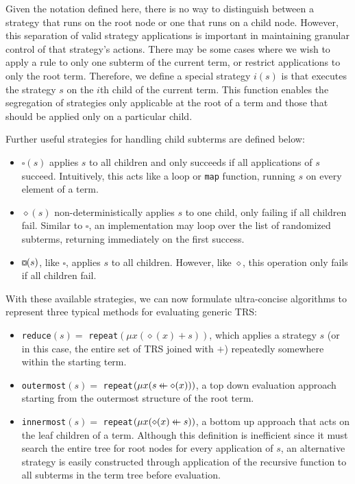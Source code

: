 \documentclass{article}
\makeatletter
\newcommand{\superimpose}[2]{{%
  \ooalign{%
    \hfil$\m@th#1\@firstoftwo#2$\hfil\cr
    \hfil$\m@th#1\@secondoftwo#2$\hfil\cr
  }%
}}
\newcommand{\leftplus}{\mathbin{\mathpalette\superimpose{{\leftarrow}{+}}}}
\newcommand{\disquare}{\mathbin{\text{\tikz [x=1ex,y=1ex,line width=.1ex,line join=round] \draw (0,0) rectangle (1,1) (.5\pgflinewidth,.5) -- (.5,1ex-.5\pgflinewidth) -- (1ex-.5\pgflinewidth,.5) -- (.5,.5\pgflinewidth) -- (.5\pgflinewidth,.5) -- cycle;}}}
\makeatother
\begin{document}
Given the notation defined here, there is no way to distinguish between a strategy that runs on the root node or one that runs on a child node.
However, this separation of valid strategy applications is important in maintaining granular control of that strategy's actions.
There may be some cases where we wish to apply a rule to only one subterm of the current term, or restrict applications to only the root term.
Therefore, we define a special strategy $i(s)$ is that executes the strategy $s$ on the $i$th child of the current term. This function enables the segregation
of strategies only applicable at the root of a term and those that should be applied only on a particular child.

Further useful strategies for handling child subterms are defined below:
\begin{itemize}
    \item $\square(s)$ applies $s$ to all children and only succeeds if all applications of $s$ succeed. Intuitively,
    this acts like a loop or \texttt{map} function, running $s$ on every element of a term.
    \item $\diamond(s)$ non-deterministically applies $s$ to one child, only failing if all children fail.
    Similar to $\square$, an implementation may loop over the list of randomized subterms, returning immediately on the first success.
    \item $\disquare(s)$, like $\square$, applies $s$ to all children. However, like $\diamond$, this operation only fails if all children fail.
\end{itemize}

With these available strategies, we can now formulate ultra-concise algorithms to represent three typical methods for evaluating generic TRS:
\begin{itemize}
    \item \texttt{reduce}$(s) = $ \texttt{repeat}$(\mu x(\diamond (x) + s))$,
    which applies a strategy $s$ (or in this case, the entire set of TRS joined with $+$)
    repeatedly somewhere within the starting term.
    \item \texttt{outermost}$(s) = $ \texttt{repeat}$(\mu x(s \leftplus \diamond (x)))$,
    a top down evaluation approach starting from the outermost structure of the root term.
    \item \texttt{innermost}$(s) = $ \texttt{repeat}$(\mu x(\diamond (x) \leftplus s))$,
    a bottom up approach that acts on the leaf children of a term. Although this definition is inefficient since it must search the entire tree for root nodes
    for every application of $s$, an alternative strategy is easily constructed through application of the recursive function to all subterms in the term tree before evaluation.
\end{itemize}
\end{document}
